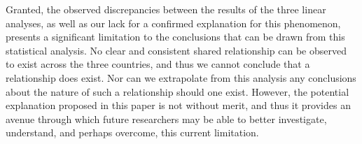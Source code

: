 \documentclass{article}
\begin{document}
Granted, the observed discrepancies between the results of the three linear analyses, as well as our lack for a confirmed explanation for this phenomenon, presents a significant limitation to the conclusions that can be drawn from this statistical analysis. No clear and consistent shared relationship can be observed to exist across the three countries, and thus we cannot conclude that a relationship does exist. Nor can we extrapolate from this analysis any conclusions about the nature of such a relationship should one exist. However, the potential explanation proposed in this paper is not without merit, and thus it provides an avenue through which future researchers may be able to better investigate, understand, and perhaps overcome, this current limitation.
\end{document}
